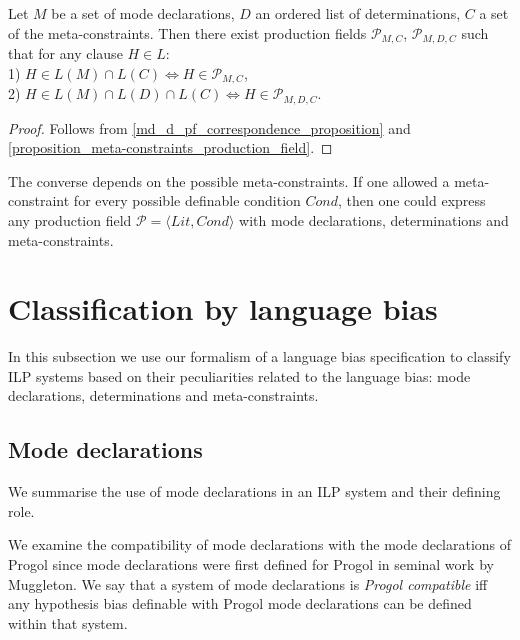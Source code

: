 \begin{corollary}
Let $M$ be a set of mode declarations, $D$ an ordered list of determinations, $C$ a set of the meta-constraints.
Then there exist production fields
$\mathcal{P}_{M,C}$,
$\mathcal{P}_{M,D,C}$
such that for any clause $H \in L$:\\
1) $H \in L(M) \cap L(C) \iff H \in \mathcal{P}_{M,C}$,\\
2) $H \in L(M) \cap L(D) \cap L(C) \iff H \in \mathcal{P}_{M,D,C}$.\\
\end{corollary}
\begin{proof}
Follows from \ref{md_d_pf_correspondence_proposition} and \ref{proposition_meta-constraints_production_field}.
\end{proof}

The converse depends on the possible meta-constraints. If one allowed a meta-constraint for every possible definable condition $Cond$, then one could express any production field $\mathcal{P}=\langle Lit, Cond \rangle$ with mode declarations, determinations and meta-constraints.

\section{Classification by language bias}\label{sec:classification_language_bias}
In this subsection we use our formalism of a language bias specification to 
classify ILP systems based on their peculiarities related to the language bias: mode declarations, determinations and meta-constraints.

\subsection{Mode declarations}\label{classification_mode_declarations}
We summarise the use of mode declarations in an ILP system and their defining role.

We examine the compatibility of mode declarations with the mode declarations of Progol since mode declarations were first defined for Progol in seminal work by Muggleton\cite{muggleton1995inverse}.
We say that a system of mode declarations is \emph{Progol compatible} iff any hypothesis bias definable with Progol mode declarations can be defined within that system.

